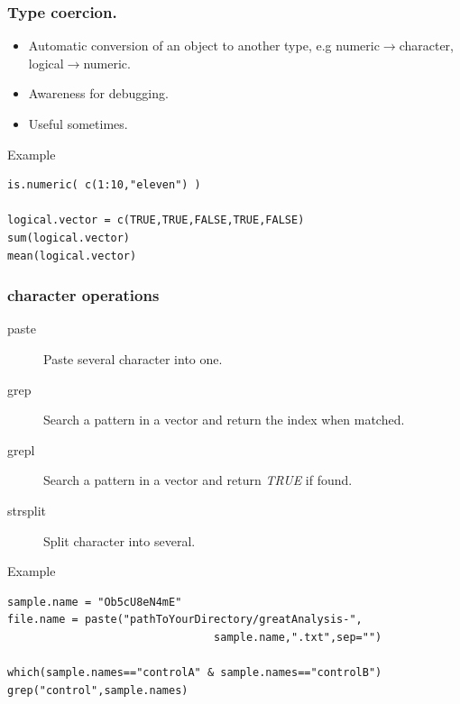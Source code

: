 \documentclass[10pt]{beamer}
\newenvironment{xframe}[2][]
  {\begin{frame}[fragile,environment=xframe,#1]
  \frametitle{#2}}
  {\end{frame}}
\begin{document}
\begin{xframe}{Type coercion.}
  \begin{block}{}
    \begin{itemize}
    \item Automatic conversion of an object to another type, e.g {\sf numeric}$\rightarrow${\sf character}, {\sf logical}$\rightarrow${\sf numeric}.
    \item Awareness for debugging.
    \item Useful sometimes.
    \end{itemize}
  \end{block}
  \begin{exampleblock}{Example}
\begin{verbatim}
is.numeric( c(1:10,"eleven") )

logical.vector = c(TRUE,TRUE,FALSE,TRUE,FALSE)
sum(logical.vector)
mean(logical.vector)
\end{verbatim}  
  \end{exampleblock}
\end{xframe}

\begin{xframe}{{\sf character} operations}
  \begin{block}{}
    \begin{description}
      \item[paste] Paste several character into one.
      \item[grep] Search a pattern in a vector and return the index when matched.
      \item[grepl] Search a pattern in a vector and return {\it TRUE} if found.
      \item[strsplit] Split character into several.
    \end{description}
  \end{block}
  \begin{exampleblock}{Example}
\begin{verbatim}
sample.name = "Ob5cU8eN4mE"
file.name = paste("pathToYourDirectory/greatAnalysis-",
                                sample.name,".txt",sep="")

which(sample.names=="controlA" & sample.names=="controlB")
grep("control",sample.names)
\end{verbatim}  
  \end{exampleblock}
\end{xframe}
\end{document}
